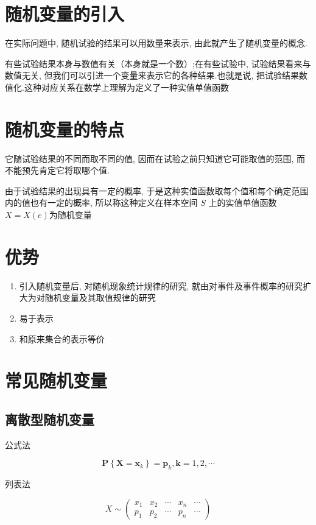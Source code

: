 
\section{随机变量的引入}

在实际问题中, 随机试验的结果可以用数量来表示, 由此就产生了随机变量的概念.

有些试验结果本身与数值有关（本身就是一个数）;在有些试验中, 试验结果看来与数值无关, 但我们可以引进一个变量来表示它的各种结果.也就是说, 把试验结果数值化.这种对应关系在数学上理解为定义了一种实值单值函数

\section{随机变量的特点}

它随试验结果的不同而取不同的值, 因而在试验之前只知道它可能取值的范围, 而不能预先肯定它将取哪个值.

由于试验结果的出现具有一定的概率, 于是这种实值函数取每个值和每个确定范围内的值也有一定的概率, 所以称这种定义在样本空间 $S$ 上的实值单值函数 $X= X(e)$为随机变量

\section{优势}

\begin{enumerate}
    \item 引入随机变量后, 对随机现象统计规律的研究, 就由对事件及事件概率的研究扩大为对随机变量及其取值规律的研究
    \item 易于表示
    \item 和原来集合的表示等价
\end{enumerate}

\section{常见随机变量}

\subsection{离散型随机变量}

公式法

$$
\boldsymbol{P}\left\{\boldsymbol{X}=\boldsymbol{x}_{k}\right\}=\boldsymbol{p}_{k}, \boldsymbol{k}=1,2, \cdots
$$

列表法
  
$$X \sim\left(\begin{array}{lllll}x_{1} & x_{2} & \cdots & x_{n} & \cdots \\ p_{1} & p_{2} & \cdots & p_{n} & \cdots\end{array}\right)$$

